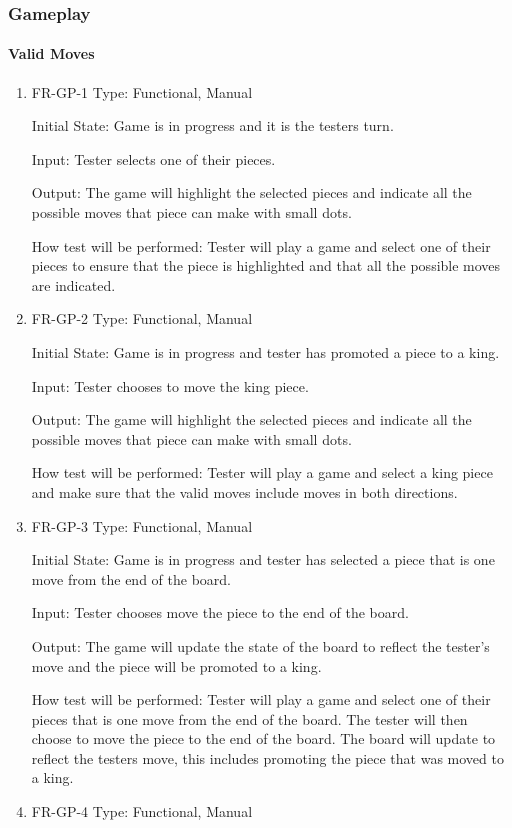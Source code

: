 \documentclass[12pt, titlepage]{article}
\begin{document}
\subsubsection{Gameplay}
\paragraph{Valid Moves}
\begin{enumerate}
    \item{FR-GP-1}
    Type: Functional, Manual
    
    Initial State: Game is in progress and it is the testers turn.
    					
    Input: Tester selects one of their pieces.
    					
    Output: The game will highlight the selected pieces and indicate all the possible moves that piece can make with small dots.
    					
    How test will be performed: Tester will play a game and select one of their pieces to ensure that the piece is highlighted and that all the possible moves are indicated.
    \item{FR-GP-2}
    Type: Functional, Manual
    
    Initial State: Game is in progress and tester has promoted a piece to a king.
    					
    Input: Tester chooses to move the king piece.
    					
    Output: The game will highlight the selected pieces and indicate all the possible moves that piece can make with small dots.
    					
    How test will be performed: Tester will play a game and select a king piece and make sure that the valid moves include moves in both directions.
    \item{FR-GP-3} 
    Type: Functional, Manual
    
    Initial State: Game is in progress and tester has selected a piece that is one move from the end of the board.
    					
    Input: Tester chooses move the piece to the end of the board.
    					
    Output: The game will update the state of the board to reflect the tester's move and the piece will be promoted to a king.
    					
    How test will be performed: Tester will play a game and select one of their pieces that is one move from the end of the board. The tester will then choose to move the piece to the end of the board. The board will update to reflect the testers move, this includes promoting the piece that was moved to a king.
    \item{FR-GP-4} 
    Type: Functional, Manual
    

\end{enumerate}
\end{document}
